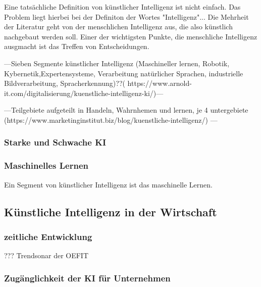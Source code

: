 \documentclass[a4paper,12pt, german]{report}
\begin{document}
Eine tatsächliche Definition von künstlicher Intelligenz ist nicht einfach. Das Problem liegt hierbei bei der Definiton der Wortes "Intelligenz"...
Die Mehrheit der Literatur geht von der menschlichen Intelligenz aus, die also künstlich nachgebaut werden soll. 
Einer der wichtigsten Punkte, die menschliche Intelligenz ausgmacht ist das Treffen von Entscheidungen. \cite{01} %

---Sieben Segmente künstlicher Intelligenz (Maschineller lernen, Robotik, Kybernetik,Expertensysteme, Verarbeitung natürlicher Sprachen, industrielle Bildverarbeitung, Spracherkennung)??( https://www.arnold-it.com/digitalisierung/kuenstliche-intelligenz-ki/)---

---Teilgebiete aufgeteilt in Handeln, Wahrnhemen und lernen, je 4 untergebiete (https://www.marketinginstitut.biz/blog/kuenstliche-intelligenz/) ---



\subsubsection{Starke und Schwache KI}




\subsubsection{Maschinelles Lernen}

Ein Segment von künstlicher Intelligenz ist das maschinelle Lernen. 



\subsection{Künstliche Intelligenz in der Wirtschaft}

\subsubsection{zeitliche Entwicklung}

??? 
Trendsonar der OEFIT

\subsubsection{Zugänglichkeit der KI für Unternehmen}
\end{document}
